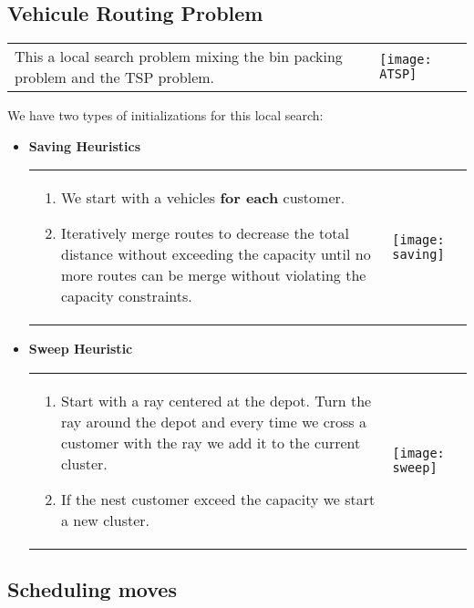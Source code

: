 \subsection{Vehicule Routing Problem}

\begin{tabular}{m{7cm}m{7cm}}
    This a local search problem mixing the bin packing problem and the TSP problem.
    &
    \texttt{[image: ATSP]}
\end{tabular}

We have two types of initializations for this local search:
\begin{itemize}
    \item \textbf{Saving Heuristics}

        \begin{tabular}{m{6cm}m{6cm}}
            \begin{enumerate}
                \item We start with a vehicles \textbf{for each}
                    customer.

                \item Iteratively merge routes to
                    decrease the total distance without exceeding the
                    capacity until no more routes can be
                    merge without violating the capacity constraints.
            \end{enumerate}
            & 
            \texttt{[image: saving]}
        \end{tabular}

    \item \textbf{Sweep Heuristic} 

        \begin{tabular}{m{6cm}m{6cm}}
            \begin{enumerate}
                \item  Start with a ray centered at the depot. Turn the
                    ray around the depot and every time we cross a
                    customer with the ray we add it to the current
                    cluster.
                \item If the nest customer exceed the capacity we start a new
                    cluster.
            \end{enumerate}
            & 
            \texttt{[image: sweep]}
        \end{tabular}
\end{itemize}

\subsection{Scheduling moves}

